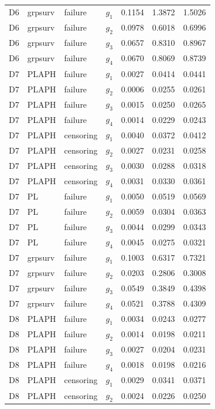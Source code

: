 \begin{longtable}{clllrrr}
D6 & grpsurv & failure & $g_{1}$ & 0.1154 & 1.3872 & 1.5026 \\
D6 & grpsurv & failure & $g_{2}$ & 0.0978 & 0.6018 & 0.6996 \\
D6 & grpsurv & failure & $g_{3}$ & 0.0657 & 0.8310 & 0.8967 \\
D6 & grpsurv & failure & $g_{4}$ & 0.0670 & 0.8069 & 0.8739 \\
D7 & PLAPH & failure & $g_{1}$ & 0.0027 & 0.0414 & 0.0441 \\
D7 & PLAPH & failure & $g_{2}$ & 0.0006 & 0.0255 & 0.0261 \\
D7 & PLAPH & failure & $g_{3}$ & 0.0015 & 0.0250 & 0.0265 \\
D7 & PLAPH & failure & $g_{4}$ & 0.0014 & 0.0229 & 0.0243 \\
D7 & PLAPH & censoring & $g_{1}$ & 0.0040 & 0.0372 & 0.0412 \\
D7 & PLAPH & censoring & $g_{2}$ & 0.0027 & 0.0231 & 0.0258 \\
D7 & PLAPH & censoring & $g_{3}$ & 0.0030 & 0.0288 & 0.0318 \\
D7 & PLAPH & censoring & $g_{4}$ & 0.0031 & 0.0330 & 0.0361 \\
D7 & PL & failure & $g_{1}$ & 0.0050 & 0.0519 & 0.0569 \\
D7 & PL & failure & $g_{2}$ & 0.0059 & 0.0304 & 0.0363 \\
D7 & PL & failure & $g_{3}$ & 0.0044 & 0.0299 & 0.0343 \\
D7 & PL & failure & $g_{4}$ & 0.0045 & 0.0275 & 0.0321 \\
D7 & grpsurv & failure & $g_{1}$ & 0.1003 & 0.6317 & 0.7321 \\
D7 & grpsurv & failure & $g_{2}$ & 0.0203 & 0.2806 & 0.3008 \\
D7 & grpsurv & failure & $g_{3}$ & 0.0549 & 0.3849 & 0.4398 \\
D7 & grpsurv & failure & $g_{4}$ & 0.0521 & 0.3788 & 0.4309 \\
D8 & PLAPH & failure & $g_{1}$ & 0.0034 & 0.0243 & 0.0277 \\
D8 & PLAPH & failure & $g_{2}$ & 0.0014 & 0.0198 & 0.0211 \\
D8 & PLAPH & failure & $g_{3}$ & 0.0027 & 0.0204 & 0.0231 \\
D8 & PLAPH & failure & $g_{4}$ & 0.0018 & 0.0198 & 0.0216 \\
D8 & PLAPH & censoring & $g_{1}$ & 0.0029 & 0.0341 & 0.0371 \\
D8 & PLAPH & censoring & $g_{2}$ & 0.0024 & 0.0226 & 0.0250 \\

\end{longtable}
